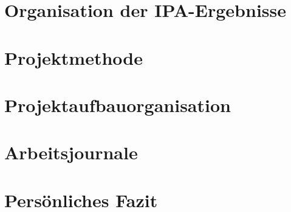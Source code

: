 \chapter{Organisation der IPA-Ergebnisse}

\chapter{Projektmethode}

\chapter{Projektaufbauorganisation}



\chapter{Arbeitsjournale}











\chapter{Persönliches Fazit}